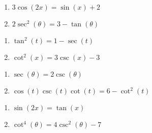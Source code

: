 \documentclass{ximera}
\begin{document}
\begin{multicols}{2}

\begin{enumerate}

\setcounter{enumi}{\value{HW}}

\item  $3\cos(2x) = \sin(x) + 2$
\item  $2\sec^{2}(\theta) = 3 - \tan(\theta)$

\setcounter{HW}{\value{enumi}}

\end{enumerate}

\end{multicols}

\begin{multicols}{2}

\begin{enumerate}

\setcounter{enumi}{\value{HW}}

\item  $\tan^{2}(t) = 1-\sec(t)$
\item  $\cot^{2}(x) = 3\csc(x) - 3$

\setcounter{HW}{\value{enumi}}

\end{enumerate}

\end{multicols}

\begin{multicols}{2}

\begin{enumerate}

\setcounter{enumi}{\value{HW}}

\item  $\sec(\theta) = 2\csc(\theta)$
\item  $\cos(t) \csc(t)\cot(t) = 6-\cot^{2}(t)$

\setcounter{HW}{\value{enumi}}

\end{enumerate}

\end{multicols}

\begin{multicols}{2}

\begin{enumerate}

\setcounter{enumi}{\value{HW}}

\item  $\sin(2x) = \tan(x)$
\item  $\cot^{4}(\theta) = 4\csc^{2}(\theta) - 7$

\setcounter{HW}{\value{enumi}}

\end{enumerate}

\end{multicols}
\end{document}
